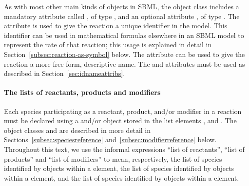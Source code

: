 As with most other main kinds of objects in SBML, the
\Reaction object class
includes a mandatory attribute called , of type
, and an optional attribute , of type
.  The  attribute is used to give the
reaction a unique identifier in the model.  This identifier can be
used in mathematical formulas elsewhere in an SBML model to
represent the rate of that reaction; this usage is explained in
detail in Section~\ref{subsec:reaction-as-symbol} below.  The
 attribute can be used to give the reaction a more
free-form, descriptive name.  The  and 
attributes must be used as described in
Section~\ref{sec:idnameattribs}.


\paragraph{The lists of reactants, products and modifiers}

Each species participating as a reactant, product, and/or modifier
in a reaction must be declared using a \SpeciesReference and/or
\ModifierSpeciesReference object stored in the list elements
,  and
.  The object classes \SpeciesReference and
\ModifierSpeciesReference are described in more detail in
Sections~\ref{subsec:speciesreference}
and~\ref{subsec:modifierreference} below.  Throughout this text,
we use the informal expressions ``list of reactants'', ``list of
products'' and ``list of modifiers'' to mean, respectively, the
list of species identified by \SpeciesReference objects within a
\Reaction {} element, the list of species
identified by \SpeciesReference objects within a \Reaction
{} element, and the list of species identified
by \ModifierSpeciesReference objects within a \Reaction
{} element.

